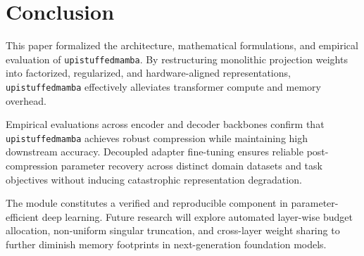 \section{Conclusion}
This paper formalized the architecture, mathematical formulations, and empirical evaluation of \texttt{upistuffedmamba}. By restructuring monolithic projection weights into factorized, regularized, and hardware-aligned representations, \texttt{upistuffedmamba} effectively alleviates transformer compute and memory overhead.

Empirical evaluations across encoder and decoder backbones confirm that \texttt{upistuffedmamba} achieves robust compression while maintaining high downstream accuracy. Decoupled adapter fine-tuning ensures reliable post-compression parameter recovery across distinct domain datasets and task objectives without inducing catastrophic representation degradation.

The module constitutes a verified and reproducible component in parameter-efficient deep learning. Future research will explore automated layer-wise budget allocation, non-uniform singular truncation, and cross-layer weight sharing to further diminish memory footprints in next-generation foundation models.
